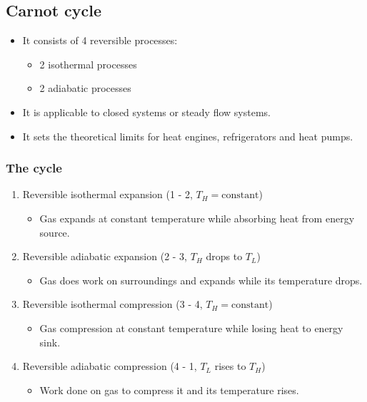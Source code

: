 \documentclass[11pt]{article}
\begin{document}
\subsection{Carnot cycle}
\label{sec:org1f4bf5b}
\begin{itemize}
\item It consists of 4 reversible processes:
\begin{itemize}
\item 2 isothermal processes
\item 2 adiabatic processes
\end{itemize}
\item It is applicable to closed systems or steady flow systems.
\item It sets the theoretical limits for heat engines, refrigerators and heat pumps.
\end{itemize}

 \newpage
\subsubsection{The cycle}
\label{sec:orgaafab49}
\begin{enumerate}
\item Reversible isothermal expansion (1 - 2, \(T_H = \text{constant}\))
\begin{itemize}
\item Gas expands at constant temperature while absorbing heat from energy source.
\end{itemize}
\item Reversible adiabatic expansion (2 - 3, \(T_H\) drops to \(T_L\))
\begin{itemize}
\item Gas does work on surroundings and expands while its temperature drops.
\end{itemize}
\item Reversible isothermal compression (3 - 4, \(T_H = \text{constant}\))
\begin{itemize}
\item Gas compression at constant temperature while losing heat to energy sink.
\end{itemize}
\item Reversible adiabatic compression (4 - 1, \(T_L\) rises to \(T_H\))
\begin{itemize}
\item Work done on gas to compress it and its temperature rises.
\end{itemize}
\end{enumerate}
\end{document}
